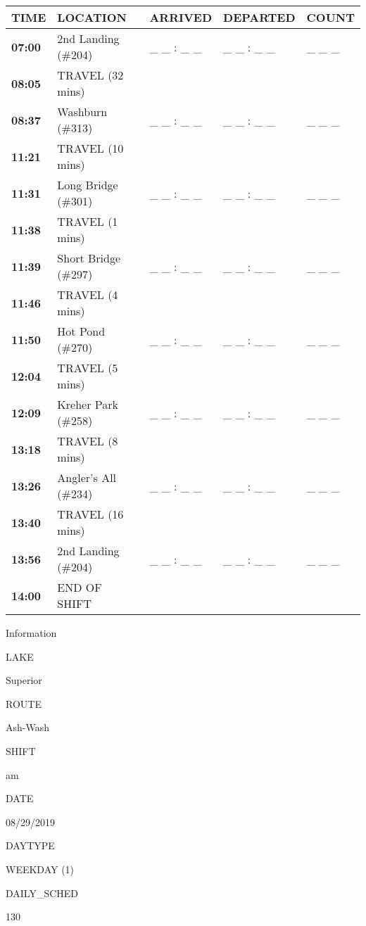 \documentclass[]{article}
\begin{document}
\begin{tabular}{>{\bfseries}lllll}
\toprule
\textbf{TIME} & \textbf{LOCATION} & \textbf{ARRIVED} & \textbf{DEPARTED} & \textbf{COUNT}\\
\midrule
07:00 & 2nd Landing (\#204) & \_ \_ : \_ \_ & \_ \_ : \_ \_ & \_ \_ \_\\
08:05 & TRAVEL (32 mins) &  &  & \\
08:37 & Washburn (\#313) & \_ \_ : \_ \_ & \_ \_ : \_ \_ & \_ \_ \_\\
11:21 & TRAVEL (10 mins) &  &  & \\
11:31 & Long Bridge (\#301) & \_ \_ : \_ \_ & \_ \_ : \_ \_ & \_ \_ \_\\
11:38 & TRAVEL (1 mins) &  &  & \\
11:39 & Short Bridge (\#297) & \_ \_ : \_ \_ & \_ \_ : \_ \_ & \_ \_ \_\\
11:46 & TRAVEL (4 mins) &  &  & \\
11:50 & Hot Pond (\#270) & \_ \_ : \_ \_ & \_ \_ : \_ \_ & \_ \_ \_\\
12:04 & TRAVEL (5 mins) &  &  & \\
12:09 & Kreher Park (\#258) & \_ \_ : \_ \_ & \_ \_ : \_ \_ & \_ \_ \_\\
13:18 & TRAVEL (8 mins) &  &  & \\
13:26 & Angler's All (\#234) & \_ \_ : \_ \_ & \_ \_ : \_ \_ & \_ \_ \_\\
13:40 & TRAVEL (16 mins) &  &  & \\
13:56 & 2nd Landing (\#204) & \_ \_ : \_ \_ & \_ \_ : \_ \_ & \_ \_ \_\\
14:00 & END OF SHIFT &  &  & \\
\bottomrule
\end{tabular}\newpage

Information

LAKE

Superior

ROUTE

Ash-Wash

SHIFT

am

DATE

08/29/2019

DAYTYPE

WEEKDAY (1)

DAILY\_SCHED

130

\vspace{24pt}
\end{document}
